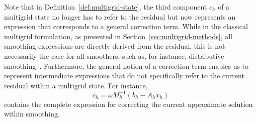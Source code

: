 Note that in Definition~\ref{def:multigrid-state}, the third component $c_{h}$ of a multigrid state no longer has to refer to the residual but now represents an expression that corresponds to a general correction term.
While in the classical multigrid formulation, as presented in Section~\ref{sec:multigrid-methods}, all smoothing expressions are directly derived from the residual, this is not necessarily the case for all smoothers, such as, for instance, distributive smoothing~\cite{trottenberg2000multigrid}.
Furthermore, the general notion of a correction term enables us to represent intermediate expressions that do not specifically refer to the current residual within a multigrid state.
For instance,
\begin{equation*}
    c_h = \omega M_h^{-1} \left( b_h - A_h x_h \right)
\end{equation*}
contains the complete expression for correcting the current approximate solution within smoothing.
